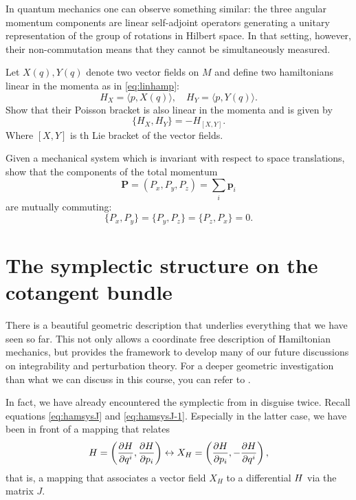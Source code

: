 \documentclass[english,fontsize=11pt,paper=a5,oneside]{scrbook}
\newcommand{\bp}{\bm{p}}
\let\d\relax
\newcommand{\d}{\mathrm{d}}
\theoremstyle{definition}
\newenvironment{example}
  {\pushQED{\qed}\renewcommand{\qedsymbol}{$\lozenge$}\examplex}
  {\popQED\endexamplex}
\newenvironment{exercise}
  {\pushQED{\qed}\renewcommand{\qedsymbol}{$\maltese$}\exercisex}
  {\popQED\endexercisex}
\begin{document}
\begin{example}
  In quantum mechanics one can observe something similar: the three angular momentum components are linear self-adjoint operators generating a unitary representation of the group of rotations in Hilbert space.
  In that setting, however, their non-commutation means that they cannot be simultaneously measured.
\end{example}

\begin{exercise}
  Let $X(q), Y(q)$ denote two vector fields on $M$ and define two hamiltonians linear in the momenta as in \eqref{eq:linhamp}:
  \begin{equation}
    H_X = \langle p, X(q)\rangle,\quad H_Y = \langle p, Y(q) \rangle.
  \end{equation}
  Show that their Poisson bracket is also linear in the momenta and is given by
  \begin{equation}
    \big\{H_X, H_Y\big\} = - H_{[X,Y]}.
  \end{equation}
  Where $[X,Y]$ is th Lie bracket of the vector fields.
\end{exercise}

\begin{exercise}
  Given a mechanical system which is invariant with respect to space translations, show that the components of the total momentum
  \begin{equation}
    \bm P = (P_x, P_y, P_z) = \sum_i \bp_i
  \end{equation}
  are mutually commuting:
  \begin{equation}
    \big\{P_x, P_y\big\}
    =\big\{P_y, P_z\big\}
    =\big\{P_z, P_x\big\}
    =0.
  \end{equation}
\end{exercise}

\section{The symplectic structure on the cotangent bundle}

There is a beautiful geometric description that underlies everything that we have seen so far.
This not only allows a coordinate free description of Hamiltonian mechanics, but provides the framework to develop many of our future discussions on integrability and perturbation theory.
For a deeper geometric investigation than what we can discuss in this course, you can refer to \cite{book:dasilva}.

In fact, we have already encountered the symplectic from in disguise twice.
Recall equations \eqref{eq:hamsysJ} and \eqref{eq:hamsysJ-1}. Especially in the latter case, we have been in front of a mapping that relates
\begin{equation}
  \d H = \left(\frac{\partial H}{\partial q^i}, \frac{\partial H}{\partial p_i}\right) \leftrightarrow X_H = \left(\frac{\partial H}{\partial p_i}, - \frac{\partial H}{\partial q^i}\right),
\end{equation}
that is, a mapping that associates a vector field $X_H$ to a differential $\d H$ via the matrix $J$.
\end{document}

